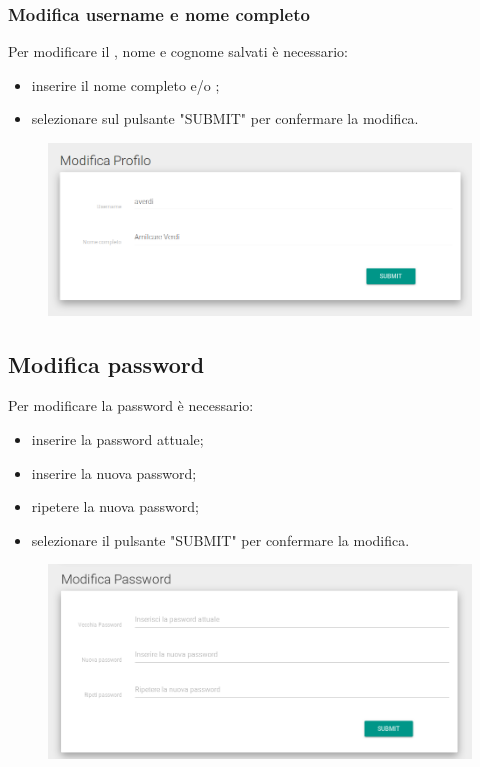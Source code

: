\documentclass[12pt,a4paper]{article}
\begin{document}
	\subsubsection{Modifica username e nome completo}
	Per modificare il , nome e cognome salvati è necessario:
	\begin{itemize}
		\item inserire il nome completo e/o ;
		\item selezionare sul pulsante "SUBMIT" per confermare la modifica.
	\end{itemize}
	\begin{figure}[h]	
		\centering
		\includegraphics[width=1.0\linewidth]{../img/screenshot/user1.png}
		\caption{}
		\label{Modifica profilo}
	\end{figure}

	
	\subsection{Modifica password}
	Per modificare la password  è necessario:
	\begin{itemize}
		\item inserire la password attuale;
		\item inserire la nuova password;
		\item ripetere la nuova password;
		\item selezionare il pulsante "SUBMIT" per confermare la modifica.
	\end{itemize}
	\begin{figure}[h]
		\centering
		\includegraphics[width=1.0\linewidth]{../img/screenshot/user2.png}
		\caption{}
		\label{Modifica password}
	\end{figure}
	
\end{document}
